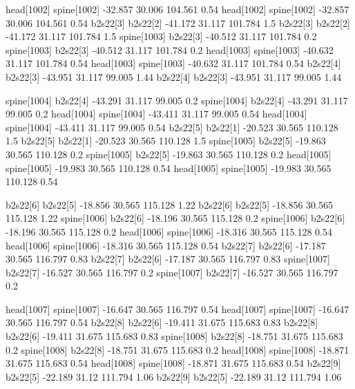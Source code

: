 head[1002]    spine[1002]    -32.857    30.006    104.561    0.54
head[1002]    spine[1002]    -32.857    30.006    104.561    0.54
b2s22[3]    b2s22[2]    -41.172    31.117    101.784    1.5
b2s22[3]    b2s22[2]    -41.172    31.117    101.784    1.5
spine[1003]    b2s22[3]    -40.512    31.117    101.784    0.2
spine[1003]    b2s22[3]    -40.512    31.117    101.784    0.2
head[1003]    spine[1003]    -40.632    31.117    101.784    0.54
head[1003]    spine[1003]    -40.632    31.117    101.784    0.54
b2s22[4]    b2s22[3]    -43.951    31.117    99.005    1.44
b2s22[4]    b2s22[3]    -43.951    31.117    99.005    1.44


spine[1004]    b2s22[4]    -43.291    31.117    99.005    0.2
spine[1004]    b2s22[4]    -43.291    31.117    99.005    0.2
head[1004]    spine[1004]    -43.411    31.117    99.005    0.54
head[1004]    spine[1004]    -43.411    31.117    99.005    0.54
b2s22[5]    b2s22[1]    -20.523    30.565    110.128    1.5
b2s22[5]    b2s22[1]    -20.523    30.565    110.128    1.5
spine[1005]    b2s22[5]    -19.863    30.565    110.128    0.2
spine[1005]    b2s22[5]    -19.863    30.565    110.128    0.2
head[1005]    spine[1005]    -19.983    30.565    110.128    0.54
head[1005]    spine[1005]    -19.983    30.565    110.128    0.54


b2s22[6]    b2s22[5]    -18.856    30.565    115.128    1.22
b2s22[6]    b2s22[5]    -18.856    30.565    115.128    1.22
spine[1006]    b2s22[6]    -18.196    30.565    115.128    0.2
spine[1006]    b2s22[6]    -18.196    30.565    115.128    0.2
head[1006]    spine[1006]    -18.316    30.565    115.128    0.54
head[1006]    spine[1006]    -18.316    30.565    115.128    0.54
b2s22[7]    b2s22[6]    -17.187    30.565    116.797    0.83
b2s22[7]    b2s22[6]    -17.187    30.565    116.797    0.83
spine[1007]    b2s22[7]    -16.527    30.565    116.797    0.2
spine[1007]    b2s22[7]    -16.527    30.565    116.797    0.2


head[1007]    spine[1007]    -16.647    30.565    116.797    0.54
head[1007]    spine[1007]    -16.647    30.565    116.797    0.54
b2s22[8]    b2s22[6]    -19.411    31.675    115.683    0.83
b2s22[8]    b2s22[6]    -19.411    31.675    115.683    0.83
spine[1008]    b2s22[8]    -18.751    31.675    115.683    0.2
spine[1008]    b2s22[8]    -18.751    31.675    115.683    0.2
head[1008]    spine[1008]    -18.871    31.675    115.683    0.54
head[1008]    spine[1008]    -18.871    31.675    115.683    0.54
b2s22[9]    b2s22[5]    -22.189    31.12    111.794    1.06
b2s22[9]    b2s22[5]    -22.189    31.12    111.794    1.06


